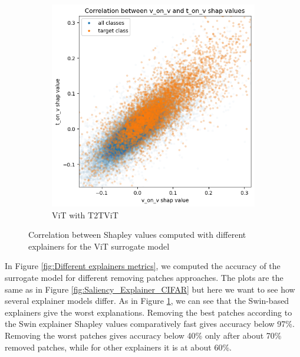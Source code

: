 \documentclass[en]{pracamgr}
\begin{document}
\begin{figure}
\begin{subfigure}{.445\textwidth}
  \centering
  \includegraphics[width=1\linewidth]{./images/v_and_t_on_vit.png}
  \caption{ViT with T2T\textunderscore ViT }
\end{subfigure}


\caption{Correlation between Shapley values computed with different explainers for the ViT surrogate model}
\label{fig:Pairs Shapley correlation}
\end{figure}




In Figure \ref{fig:Different explainers metrics}, we computed the accuracy of the surrogate model for different removing patches approaches. The plots are the same as in Figure \ref{fig:Saliency_Explainer_CIFAR} but here we want to see how several explainer models differ. As in Figure \ref{fig:Pairs Shapley correlation}, we can see that the Swin-based explainers give the worst explanations. Removing the best patches according to the Swin explainer Shapley values comparatively fast gives accuracy below 97\%. Removing the worst patches gives accuracy below 40\% only after about 70\% removed patches, while for other explainers it is at about 60\%.
\end{document}
